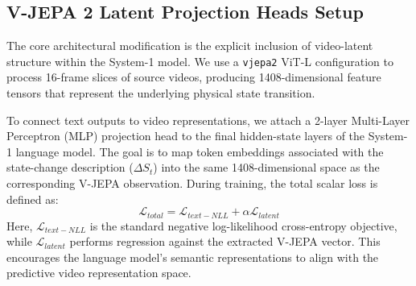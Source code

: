 \documentclass{article}
\begin{document}
\subsection{V-JEPA 2 Latent Projection Heads Setup}
The core architectural modification is the explicit inclusion of video-latent structure within the System-1 model. We use a \texttt{vjepa2} ViT-L configuration to process 16-frame slices of source videos, producing 1408-dimensional feature tensors that represent the underlying physical state transition.

To connect text outputs to video representations, we attach a 2-layer Multi-Layer Perceptron (MLP) projection head to the final hidden-state layers of the System-1 language model. The goal is to map token embeddings associated with the state-change description ($\Delta S_t$) into the same 1408-dimensional space as the corresponding V-JEPA observation. During training, the total scalar loss is defined as:
\begin{equation}
    \mathcal{L}_{total} = \mathcal{L}_{text-NLL} + \alpha \mathcal{L}_{latent}
\end{equation}
Here, $\mathcal{L}_{text-NLL}$ is the standard negative log-likelihood cross-entropy objective, while $\mathcal{L}_{latent}$ performs regression against the extracted V-JEPA vector. This encourages the language model's semantic representations to align with the predictive video representation space.
\end{document}
